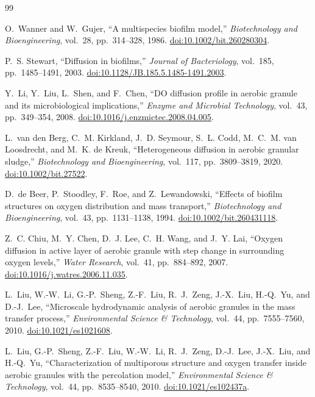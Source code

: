 \documentclass[11pt,a4paper]{article}
\begin{document}
\begin{thebibliography}{99}

O.~Wanner and W.~Gujer,
``A multispecies biofilm model,''
\emph{Biotechnology and Bioengineering}, vol.~28, pp.~314--328, 1986.
\href{https://doi.org/10.1002/bit.260280304}
{doi:10.1002/bit.260280304}.

P.~S. Stewart,
``Diffusion in biofilms,''
\emph{Journal of Bacteriology}, vol.~185, pp.~1485--1491, 2003.
\href{https://doi.org/10.1128/JB.185.5.1485-1491.2003}
{doi:10.1128/JB.185.5.1485-1491.2003}.

Y.~Li, Y.~Liu, L.~Shen, and F.~Chen,
``DO diffusion profile in aerobic granule and its microbiological
implications,''
\emph{Enzyme and Microbial Technology}, vol.~43, pp.~349--354, 2008.
\href{https://doi.org/10.1016/j.enzmictec.2008.04.005}
{doi:10.1016/j.enzmictec.2008.04.005}.

L.~van den Berg, C.~M. Kirkland, J.~D. Seymour, S.~L. Codd,
M.~C.~M. van Loosdrecht, and M.~K. de Kreuk,
``Heterogeneous diffusion in aerobic granular sludge,''
\emph{Biotechnology and Bioengineering}, vol.~117, pp.~3809--3819, 2020.
\href{https://doi.org/10.1002/bit.27522}
{doi:10.1002/bit.27522}.

D.~de Beer, P.~Stoodley, F.~Roe, and Z.~Lewandowski,
``Effects of biofilm structures on oxygen distribution and mass transport,''
\emph{Biotechnology and Bioengineering}, vol.~43, pp.~1131--1138, 1994.
\href{https://doi.org/10.1002/bit.260431118}
{doi:10.1002/bit.260431118}.

Z.~C. Chiu, M.~Y. Chen, D.~J. Lee, C.~H. Wang, and J.~Y. Lai,
``Oxygen diffusion in active layer of aerobic granule with step change in
surrounding oxygen levels,''
\emph{Water Research}, vol.~41, pp.~884--892, 2007.
\href{https://doi.org/10.1016/j.watres.2006.11.035}
{doi:10.1016/j.watres.2006.11.035}.

L.~Liu, W.-W.~Li, G.-P.~Sheng, Z.-F.~Liu, R.~J.~Zeng, J.-X.~Liu,
H.-Q.~Yu, and D.-J.~Lee,
``Microscale hydrodynamic analysis of aerobic granules in the mass transfer
process,''
\emph{Environmental Science \& Technology}, vol.~44, pp.~7555--7560, 2010.
\href{https://doi.org/10.1021/es1021608}
{doi:10.1021/es1021608}.

L.~Liu, G.-P.~Sheng, Z.-F.~Liu, W.-W.~Li, R.~J.~Zeng, D.-J.~Lee,
J.-X.~Liu, and H.-Q.~Yu,
``Characterization of multiporous structure and oxygen transfer inside
aerobic granules with the percolation model,''
\emph{Environmental Science \& Technology}, vol.~44, pp.~8535--8540, 2010.
\href{https://doi.org/10.1021/es102437a}
{doi:10.1021/es102437a}.


\end{thebibliography}
\end{document}
